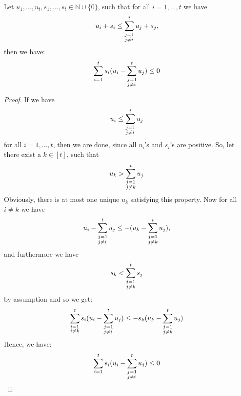 \begin{lem}\label{lemma8}
Let \(u_1,\ldots,u_t,s_1,\ldots,s_t\in\mathbb{N}\cup\{0\}\), such that for all \(i=1,\ldots,t\) we have
\[
u_i+s_i\leq\sum_{\begin{subarray}{l}j=1\\ j\neq i\end{subarray}}^tu_j+s_j,
\]
then we have:
\[
\sum\limits_{i=1}^ts_i(u_i-\sum_{\begin{subarray}{l}j=1\\ j\neq i\end{subarray}}^tu_j)\leq 0
\]
\begin{proof}
If we have
\[
u_i\leq\sum_{\begin{subarray}{l}j=1\\ j\neq i\end{subarray}}^tu_j
\]
for all \(i=1,\ldots,t\), then we are done, since all \(u_i\)'s and \(s_i\)'s are positive. So, let there exist a \(k\in[t]\), such that
\[
u_k>\sum_{\begin{subarray}{l}j=1\\ j\neq k\end{subarray}}^tu_j
\]
Obviously, there is at most one unique \(u_k\) satisfying this property. Now for all \(i\neq k\) we have
\[
u_i-\sum_{\begin{subarray}{l}j=1\\ j\neq i\end{subarray}}^tu_j\leq -(u_k-\sum_{\begin{subarray}{l}j=1\\ j\neq k\end{subarray}}^tu_j),
\]
and furthermore we have
\[
s_k<\sum_{\begin{subarray}{l}j=1\\ j\neq k\end{subarray}}^ts_j
\]
by assumption and so we get:
\[
\sum_{\begin{subarray}{l}i=1\\ i\neq k\end{subarray}}^ts_i(u_i-\sum_{\begin{subarray}{l}j=1\\ j\neq i\end{subarray}}^tu_j)\leq-s_k(u_k-\sum_{\begin{subarray}{l}j=1\\ j\neq k\end{subarray}}^tu_j)
\]
Hence, we have:
\[
\sum\limits_{i=1}^ts_i(u_i-\sum_{\begin{subarray}{l}j=1\\ j\neq i\end{subarray}}^tu_j)\leq 0
\]
\end{proof}
\end{lem}

